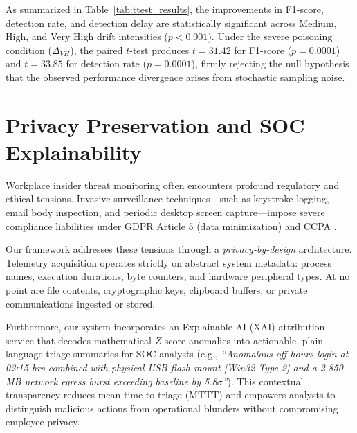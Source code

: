\documentclass[conference]{IEEEtran}
\begin{document}
As summarized in Table~\ref{tab:ttest_results}, the improvements in F1-score, detection rate, and detection delay are statistically significant across Medium, High, and Very High drift intensities ($p < 0.001$). Under the severe poisoning condition ($\Delta_{VH}$), the paired $t$-test produces $t = 31.42$ for F1-score ($p = 0.0001$) and $t = 33.85$ for detection rate ($p = 0.0001$), firmly rejecting the null hypothesis that the observed performance divergence arises from stochastic sampling noise.

\section{Privacy Preservation and SOC Explainability}
Workplace insider threat monitoring often encounters profound regulatory and ethical tensions. Invasive surveillance techniques---such as keystroke logging, email body inspection, and periodic desktop screen capture---impose severe compliance liabilities under GDPR Article 5 (data minimization) and CCPA \cite{b10}. 

Our framework addresses these tensions through a \textit{privacy-by-design} architecture. Telemetry acquisition operates strictly on abstract system metadata: process names, execution durations, byte counters, and hardware peripheral types. At no point are file contents, cryptographic keys, clipboard buffers, or private communications ingested or stored.

Furthermore, our system incorporates an Explainable AI (XAI) attribution service \cite{b11} that decodes mathematical $Z$-score anomalies into actionable, plain-language triage summaries for SOC analysts (e.g., \textit{``Anomalous off-hours login at 02:15 hrs combined with physical USB flash mount [Win32 Type 2] and a 2,850 MB network egress burst exceeding baseline by 5.8$\sigma$''}). This contextual transparency reduces mean time to triage (MTTT) and empowers analysts to distinguish malicious actions from operational blunders without compromising employee privacy.
\end{document}
